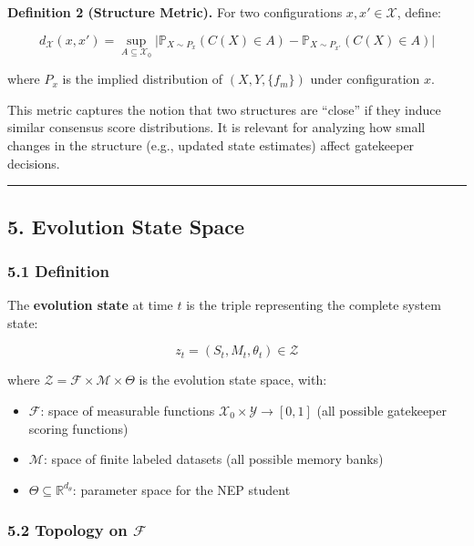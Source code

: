 \documentclass[
  12pt,
]{article}
\providecommand{\tightlist}{%
  \setlength{\itemsep}{0pt}\setlength{\parskip}{0pt}}
\begin{document}
\textbf{Definition 2 (Structure Metric).} For two configurations
\(x, x' \in \mathcal{X}\), define:

\[d_{\mathcal{X}}(x, x') = \sup_{A \subseteq \mathcal{X}_0} \bigl| \mathbb{P}_{X \sim P_x}(C(X) \in A) - \mathbb{P}_{X \sim P_{x'}}(C(X) \in A) \bigr|\]

where \(P_x\) is the implied distribution of \((X, Y, \{f_m\})\) under
configuration \(x\).

This metric captures the notion that two structures are ``close'' if
they induce similar consensus score distributions. It is relevant for
analyzing how small changes in the structure (e.g., updated state
estimates) affect gatekeeper decisions.

\begin{center}\rule{0.5\linewidth}{0.5pt}\end{center}

\subsection{5. Evolution State Space}\label{evolution-state-space}

\subsubsection{5.1 Definition}\label{definition-1}

The \textbf{evolution state} at time \(t\) is the triple representing
the complete system state:

\[z_t = (S_t, M_t, \theta_t) \in \mathcal{Z}\]

where \(\mathcal{Z} = \mathcal{F} \times \mathcal{M} \times \Theta\) is
the evolution state space, with:

\begin{itemize}
\tightlist
\item
  \(\mathcal{F}\): space of measurable functions
  \(\mathcal{X}_0 \times \mathcal{Y} \to [0,1]\) (all possible
  gatekeeper scoring functions)
\item
  \(\mathcal{M}\): space of finite labeled datasets (all possible memory
  banks)
\item
  \(\Theta \subseteq \mathbb{R}^{d_\theta}\): parameter space for the
  NEP student
\end{itemize}

\subsubsection{\texorpdfstring{5.2 Topology on
\(\mathcal{F}\)}{5.2 Topology on \textbackslash mathcal\{F\}}}\label{topology-on-mathcalf}
\end{document}
